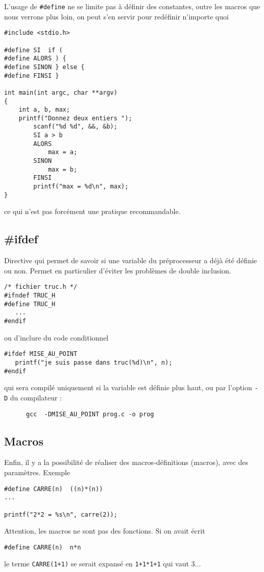 \documentclass[10pt]{article}
\begin{document}
L'usage de \texttt{\#define} ne se limite pas à définir des constantes, outre les macros
que nous verrons plus loin, on peut s'en servir pour redéfinir n'importe quoi
\begin{lstlisting}
#include <stdio.h>

#define SI  if (
#define ALORS ) {
#define SINON } else {
#define FINSI }

int main(int argc, char **argv)
{
	int a, b, max;
	printf("Donnez deux entiers ");
        scanf("%d %d", &&, &b);
        SI a > b
        ALORS 
            max = a;
        SINON 
            max = b;
        FINSI
        printf("max = %d\n", max);
}
\end{lstlisting}
ce qui n'est pas forcément une pratique recommandable.

\subsection{{\#ifdef}}

Directive qui permet de savoir si une variable du préprocesseur a déjà été définie 
ou non. Permet en particulier d'éviter les problèmes de double inclusion.
\begin{lstlisting}
/* fichier truc.h */
#ifndef TRUC_H
#define TRUC_H
   ...
#endif
\end{lstlisting}
ou d'inclure du code conditionnel
\begin{lstlisting}
#ifdef MISE_AU_POINT
   printf("je suis passe dans truc(%d)\n", n);
#endif
\end{lstlisting}

qui sera compilé uniquement si la variable est définie plus haut, ou
par l'option \texttt{-D} du compilateur  :
\begin{lstlisting}
      gcc  -DMISE_AU_POINT prog.c -o prog
\end{lstlisting}

\subsection{Macros}

Enfin, il y a la possibilité de réaliser des macros-définitions (macros), avec des paramètres.
Exemple
\begin{lstlisting}
#define CARRE(n)  ((n)*(n))
...

printf("2*2 = %s\n", carre(2));
\end{lstlisting}

Attention, les macros ne sont pas des fonctions. Si on avait écrit
\begin{lstlisting}
#define CARRE(n)  n*n
\end{lstlisting}
le terme \texttt{CARRE(1+1)} se serait expansé en \texttt{1+1*1+1} qui vaut 3...
\end{document}
